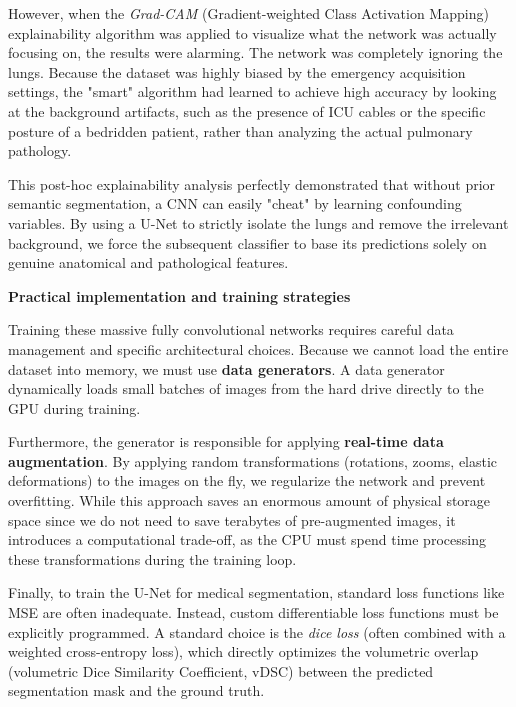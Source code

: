 However, when the \textit{Grad-CAM} (Gradient-weighted Class Activation Mapping) explainability algorithm was applied to visualize what the network was actually focusing on, the results were alarming. The network was completely ignoring the lungs. Because the dataset was highly biased by the emergency acquisition settings, the "smart" algorithm had learned to achieve high accuracy by looking at the background artifacts, such as the presence of ICU cables or the specific posture of a bedridden patient, rather than analyzing the actual pulmonary pathology. 

This post-hoc explainability analysis perfectly demonstrated that without prior semantic segmentation, a CNN can easily "cheat" by learning confounding variables. By using a U-Net to strictly isolate the lungs and remove the irrelevant background, we force the subsequent classifier to base its predictions solely on genuine anatomical and pathological features.


\textbf{Practical implementation and training strategies}

Training these massive fully convolutional networks requires careful data management and specific architectural choices. Because we cannot load the entire dataset into memory, we must use \textbf{data generators}. A data generator dynamically loads small batches of images from the hard drive directly to the GPU during training. 

Furthermore, the generator is responsible for applying \textbf{real-time data augmentation}. By applying random transformations (rotations, zooms, elastic deformations) to the images on the fly, we regularize the network and prevent overfitting. While this approach saves an enormous amount of physical storage space since we do not need to save terabytes of pre-augmented images, it introduces a computational trade-off, as the CPU must spend time processing these transformations during the training loop.

Finally, to train the U-Net for medical segmentation, standard loss functions like MSE are often inadequate. Instead, custom differentiable loss functions must be explicitly programmed. A standard choice is the \textit{dice loss} (often combined with a weighted cross-entropy loss), which directly optimizes the volumetric overlap (volumetric Dice Similarity Coefficient, vDSC) between the predicted segmentation mask and the ground truth.

